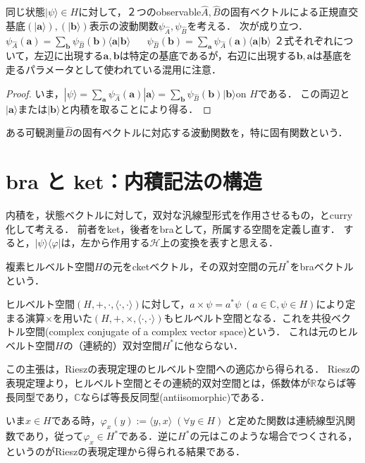 \documentclass[uplatex, dvipdfmx]{jsreport}
\begin{document}
\begin{proposition}[波動関数の基底変換]
    同じ状態$|\psi\rangle\in H$に対して，２つのobservable$\hat{A},\hat{B}$の固有ベクトルによる正規直交基底$(|\mathbf{a}\rangle),(|\mathbf{b}\rangle)$表示の波動関数$\psi_{\hat{A}},\psi_{\hat{B}}$を考える．
    次が成り立つ．
    $\psi_{\hat{A}} (\mathbf{a}) = \sum_\mathbf{b} \psi_{\hat{B}} (\mathbf{b}) \langle\mathbf{a}|\mathbf{b}\rangle$ 　
    $\psi_{\hat{B}}(\mathbf{b})=\sum_\mathbf{a}\psi_{\hat{A}}(\mathbf{a})\langle\mathbf{a}|\mathbf{b}\rangle$
    ２式それぞれについて，左辺に出現する$\mathbf{a},\mathbf{b}$は特定の基底であるが，右辺に出現する$\mathbf{b},\mathbf{a}$は基底を走るパラメータとして使われている混用に注意．
\end{proposition}
\begin{proof}
    いま，$|\psi\rangle=\sum_\mathbf{a}\psi_{\hat{A}}(\mathbf{a})|\mathbf{a}\rangle=\sum_\mathbf{b}\psi_{\hat{B}}(\mathbf{b})|\mathbf{b}\rangle$on $H$である．
    この両辺と$|\mathbf{a}\rangle$または$|\mathbf{b}\rangle$と内積を取ることにより得る．
\end{proof}

\begin{definition}[eigenfunction]
    ある可観測量$\hat{B}$の固有ベクトルに対応する波動関数を，特に固有関数という．
\end{definition}

\section{bra と ket：内積記法の構造}

内積を，状態ベクトルに対して，双対な汎線型形式を作用させるもの，とcurry化して考える．
前者をket，後者をbraとして，所属する空間を定義し直す．
すると，$|\psi\rangle\langle\varphi|$は，左から作用する$\mathcal{H}$上の変換を表すと思える．

\begin{definition}
    複素ヒルベルト空間$H$の元をcketベクトル，その双対空間の元$H^*$をbraベクトルという．
\end{definition}
\begin{proposition}
    ヒルベルト空間$(H,+,\cdot, \langle\cdot,\cdot\rangle)$に対して，$a\times\psi=a^*\psi\;(a\in\mathbb{C},\psi\in H)$により定まる演算$\times$を用いた$(H,+,\times,\langle\cdot,\cdot\rangle)$もヒルベルト空間となる．これを共役ベクトル空間(complex conjugate of a complex vector space)という．
    これは元のヒルベルト空間$H$の（連続的）双対空間$H^*$に他ならない．
\end{proposition}
\begin{remark}
    この主張は，Rieszの表現定理のヒルベルト空間への適応から得られる．
    Rieszの表現定理より，ヒルベルト空間とその連続的双対空間とは，係数体が$\mathbb{R}$ならば等長同型であり，$\mathbb{C}$ならば等長反同型(antiisomorphic)である．

    いま$x\in H$である時，$\varphi_x(y):=\langle y,x\rangle\; (\forall y\in H)$
    と定めた関数は連続線型汎関数であり，従って$\varphi_x\in H^*$である．逆に$H^*$の元はこのような場合でつくされる，というのがRieszの表現定理から得られる結果である．
\end{remark}
\end{document}
